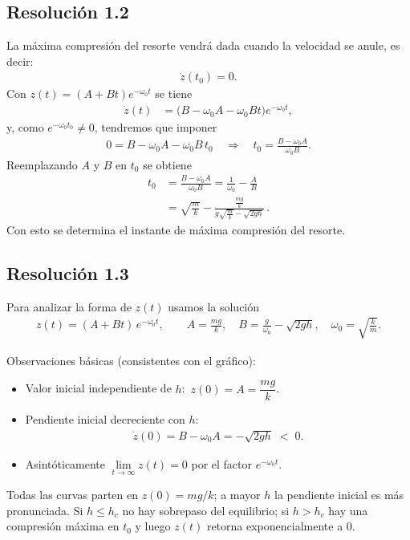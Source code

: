 \documentclass[
  11pt,
  letterpaper,
   addpoints,
  ]{exam}
\begin{document}
\begin{questions}
\begin{solution}
\subsection*{Resolución 1.2}
La máxima compresión del resorte vendrá dada cuando la velocidad se anule, es decir:
\begin{align}
\dot z(t_0)=0.
\end{align}
Con $z(t)=(A+Bt)e^{-\omega_0 t}$ se tiene
\begin{align}
\dot z(t)&=\big(B-\omega_0A-\omega_0Bt\big)e^{-\omega_0 t},
\end{align}
y, como $e^{-\omega_0 t_0}\neq 0$, tendremos que imponer
\begin{align}
0=B-\omega_0A-\omega_0B\,t_0
\quad\Longrightarrow\quad
t_0=\frac{B-\omega_0A}{\omega_0 B}.
\end{align}
Reemplazando $A$ y $B$ en $t_{0}$ se obtiene
\begin{align}
  t_{0} &= \frac{B - \omega_{0}A}{\omega_{0}B} = \frac{1}{\omega_{0}} - \frac{A}{B}\\
  &= \sqrt{\frac{m}{k}} - \frac{\frac{mg}{k}}{g\sqrt{\frac{m}{k}}-\sqrt{2gh}}\,.
\end{align}
Con esto se determina el instante de máxima compresión del resorte.

\subsection*{Resolución 1.3}
Para analizar la forma de $z(t)$ usamos la solución
\begin{align}
z(t) = (A+Bt)\,e^{-\omega_0 t},\qquad A=\frac{mg}{k},\quad B=\frac{g}{\omega_0}-\sqrt{2gh},\quad \omega_0=\sqrt{\frac{k}{m}}.
\end{align}

Observaciones básicas (consistentes con el gráfico):
\begin{itemize}
  \item Valor inicial independiente de $h$: $\,z(0)=A=\dfrac{mg}{k}$.
  \item Pendiente inicial decreciente con $h$:
  \begin{align}
    \dot z(0)=B-\omega_0 A= -\sqrt{2gh} \;<\; 0.
  \end{align}
  \item Asintóticamente $\lim\limits_{t\to\infty} z(t)=0$ por el factor $e^{-\omega_0 t}$.
\end{itemize}

Todas las curvas parten en $z(0)=mg/k$; a mayor $h$ la pendiente inicial es más pronunciada. Si $h\le h_c$ no hay sobrepaso del equilibrio; si $h>h_c$ hay una compresión máxima en $t_0$ y luego $z(t)$ retorna exponencialmente a $0$.


\end{solution}
\end{questions}
\end{document}
